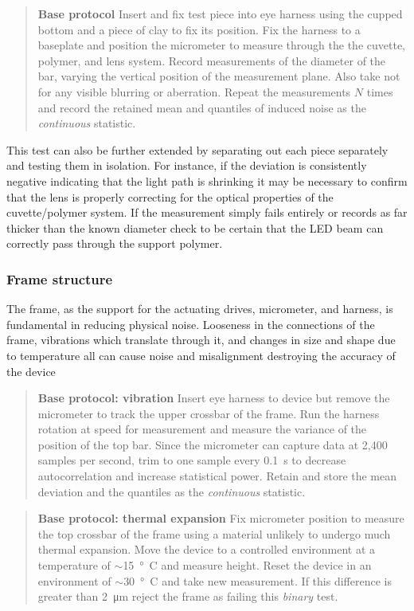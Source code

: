 \documentclass{article}
\begin{document}
\begin{quotation}
  \textbf{Base protocol} Insert and fix test piece into eye harness   using the cupped bottom and a piece of clay to fix its position. Fix   the harness to a baseplate and position the micrometer to measure   through the the cuvette, polymer, and lens system. Record   measurements of the diameter of the bar, varying the vertical   position of the measurement plane. Also take not for any visible   blurring or aberration. Repeat the measurements $N$ times and record   the retained mean and quantiles of induced noise as the   \textit{continuous} statistic.
\end{quotation}

This test can also be further extended by separating out each piece separately and testing them in isolation. For instance, if the deviation is consistently negative indicating that the light path is shrinking it may be necessary to confirm that the lens is properly correcting for the optical properties of the cuvette/polymer system. If the measurement simply fails entirely or records as far thicker than the known diameter check to be certain that the LED beam can correctly pass through the support polymer.


\subsubsection{Frame structure}
The frame, as the support for the actuating drives, micrometer, and harness, is fundamental in reducing physical noise. Looseness in the connections of the frame, vibrations which translate through it, and changes in size and shape due to temperature all can cause noise and misalignment destroying the accuracy of the device

\begin{quotation}
  \textbf{Base protocol: vibration} Insert eye harness to device but   remove the micrometer to track the upper crossbar of the frame. Run   the harness rotation at speed for measurement and measure the   variance of the position of the top bar. Since the micrometer can   capture data at 2,400 samples per second, trim to one sample every   \SI{0.1}{\second} to decrease autocorrelation and increase   statistical power. Retain and store the mean deviation and the   quantiles as the \textit{continuous} statistic.
\end{quotation}

\begin{quotation}
  \textbf{Base protocol: thermal expansion} Fix micrometer position to   measure the top crossbar of the frame using a material unlikely to   undergo much thermal expansion. Move the device to a controlled   environment at a temperature of $\sim$\SI{15}{\degree C} and measure   height. Reset the device in an environment of $\sim$\SI{30}{\degree     C} and take new measurement. If this difference is greater than   \SI{2}{\micro m} reject the frame as failing this \textit{binary} test.
\end{quotation}
\end{document}
